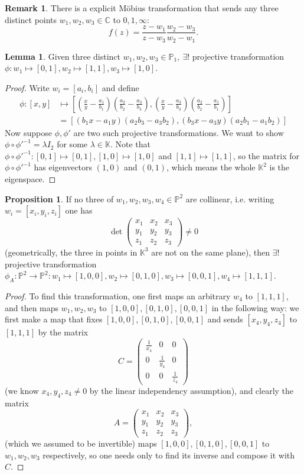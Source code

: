 \documentclass{article}
\newcommand{\C}{\mathbb{C}}
\newcommand{\K}{\mathbb{K}}
\newcommand{\p}{\mathbb{P}}
\theoremstyle{definition}
\newtheorem{prop}[defn]{Proposition}
\newtheorem{lemma}[defn]{Lemma}
\newtheorem{remark}[defn]{Remark}
\begin{document}
\begin{remark}
There is a explicit Möbius transformation that sends any three distinct points $w_1,w_2,w_3\in\C$ to $0,1,\infty$:
\[
f(z)=\frac{z-w_1}{z-w_3}\frac{w_2-w_3}{w_2-w_1}.
\]
\end{remark}
\begin{lemma}
Given three distinct $w_1,w_2,w_3\in\p_1,\ \exists!$ projective transformation $\phi:w_1\mapsto[0,1],w_2\mapsto[1,1],w_3\mapsto[1,0]$.
\end{lemma}
\begin{proof}
Write $w_i=[a_i,b_i]$ and define
\[
\begin{aligned}
\phi:[x,y]&\mapsto \left[\left(\frac{x}{y}-\frac{a_1}{b_1}\right)\left(\frac{a_2}{b_2}-\frac{a_3}{b_3}\right),\left(\frac{x}{y}-\frac{a_3}{b_3}\right)\left(\frac{a_2}{b_2}-\frac{a_1}{b_1}\right)\right]\\
&=[(b_1x-a_1y)(a_2b_3-a_3b_2),(b_3x-a_3y)(a_2b_1-a_1b_2)]
\end{aligned}
\]
Now suppose $\phi,\phi'$ are two such projective transformations. We want to show $\phi\circ\phi'^{-1}=\lambda I_2$ for some $\lambda\in\K$. Note that $\phi\circ\phi'^{-1}:[0,1]\mapsto [0,1],[1,0]\mapsto [1,0]$ and $[1,1]\mapsto [1,1]$, so the matrix for $\phi\circ\phi'^{-1}$ has eigenvectors $(1,0)$ and $(0,1)$, which means the whole $\K^2$ is the eigenspace.
\end{proof}

\begin{prop}
If no three of $w_1,w_2,w_3,w_4\in\p^2$ are collinear, i.e. writing $w_i=[x_i,y_i,z_i]$ one has
\[
\det\begin{pmatrix}
x_1 & x_2 & x_3 \\ y_1 & y_2 & y_3 \\ z_1 & z_2 & z_3
\end{pmatrix}\neq 0
\](geometrically, the three in points in $\K^3$ are not on the same plane), then $\exists!$ projective transformation $\phi_A:\p^2\rightarrow\p^2:w_1\mapsto [1,0,0],w_2\mapsto [0,1,0],w_3\mapsto [0,0,1],w_4\mapsto [1,1,1]$.
\end{prop}
\begin{proof}
To find this transformation, one first maps an arbitrary $w_4$ to $[1,1,1]$, and then maps $w_1,w_2,w_3$ to $[1,0,0],[0,1,0],[0,0,1]$ in the following way: we first make a map that fixes $[1,0,0],[0,1,0],[0,0,1]$ and sends $[x_4,y_4,z_4]$ to $[1,1,1]$ by the matrix
\[
C=\begin{pmatrix}
\frac{1}{x_4} & 0 & 0 \\
0 & \frac{1}{y_4} & 0 \\
0 & 0 & \frac{1}{z_4}
\end{pmatrix}
\]
(we know $x_4,y_4,z_4\neq 0$ by the linear independency assumption), and clearly the matrix
\[
A=\begin{pmatrix}
x_1 & x_2 & x_3 \\ y_1 & y_2 & y_3 \\ z_1 & z_2 & z_3
\end{pmatrix},
\]
(which we assumed to be invertible) maps $[1,0,0],[0,1,0],[0,0,1]$ to $w_1,w_2,w_3$ respectively, so one needs only to find its inverse and compose it with $C$.
\end{proof}
\end{document}
